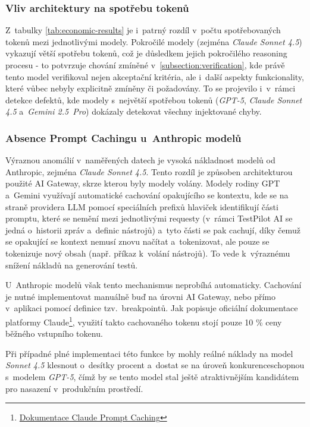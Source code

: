 \documentclass[czech, ing, kiv, he, iso690numb, viewonly]{fasthesis}
\begin{document}
\subsubsection*{Vliv architektury na spotřebu tokenů}
Z~tabulky \ref{tab:economic-results} je i~patrný rozdíl v~počtu spotřebovaných tokenů mezi jednotlivými modely.
Pokročilé modely (zejména \textit{Claude Sonnet 4.5}) vykazují větší spotřebu tokenů, 
což je důsledkem jejich pokročilého reasoning procesu - to potvrzuje chování zmíněné v~\ref{subsection:verification}, kde právě tento model verifikoval nejen akceptační kritéria, 
ale i~další aspekty funkcionality, které vůbec nebyly explicitně zmíněny či požadovány.
To se projevilo i~v~rámci detekce defektů, kde modely s~největší spotřebou tokenů
(\textit{GPT-5}, \textit{Claude Sonnet 4.5} a~\textit{Gemini 2.5~Pro}) dokázaly detekovat všechny injektované chyby.


\subsubsection*{Absence Prompt Cachingu u~Anthropic modelů}
Výraznou anomálií v~naměřených datech je vysoká nákladnost modelů od Anthropic, zejména \textit{Claude Sonnet 4.5}.
Tento rozdíl je způsoben architekturou použité AI Gateway, skrze kterou byly modely volány.
Modely rodiny GPT a~Gemini využívají automatické cachování opakujícího se kontextu,
kde se na straně providera LLM pomocí speciálních prefixů hlaviček identifikují části promptu, 
které se nemění mezi jednotlivými requesty (v~rámci TestPilot AI se jedná o~historii zpráv a~definic nástrojů)
a~tyto části se pak cachují, díky čemuž se opakující se kontext nemusí znovu načítat a~tokenizovat,
ale pouze se tokenizuje nový obsah (např. příkaz k~volání nástrojů). To vede k~výraznému 
snížení nákladů na generování testů.

U~Anthropic modelů však tento mechanismus neprobíhá automaticky. 
Cachování je nutné implementovat manuálně buď na úrovni AI Gateway, 
nebo přímo v~aplikaci pomocí definice tzv.~breakpointů.
Jak popisuje oficiální dokumentace platformy Claude\footnote{\href{https://platform.claude.com/docs/en/build-with-claude/prompt-caching\#understanding-cache-breakpoint-costs}
{Dokumentace Claude Prompt Caching}}, využití takto cachovaného tokenu stojí 
pouze 10 \% ceny běžného vstupního tokenu.

Při případné plné implementaci této funkce 
by mohly reálné náklady na model \textit{Sonnet 4.5} klesnout o~desítky procent a~dostat se na úroveň konkurenceschopnou s~modelem \textit{GPT-5}, čímž by se tento model stal ještě atraktivnějším 
kandidátem pro nasazení v~produkčním prostředí.
\end{document}
